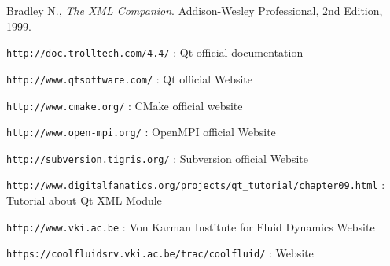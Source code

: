 \begin{thebibliography}{9}
 
  Bradley N.,
  \emph{The XML Companion}.
  Addison-Wesley Professional,
  2nd Edition,
  1999.
 
 \texttt{http://doc.trolltech.com/4.4/} :
 Qt official documentation

 \texttt{http://www.qtsoftware.com/} :
 Qt official Website

 \texttt{http://www.cmake.org/} :
 CMake official website

 \texttt{http://www.open-mpi.org/} :
 OpenMPI official Website

 \texttt{http://subversion.tigris.org/} :
 Subversion official Website

 \texttt{http://www.digitalfanatics.org/projects/qt_tutorial/chapter09.html} :
 Tutorial about Qt XML Module

 \texttt{http://www.vki.ac.be} :
 Von Karman Institute for Fluid Dynamics Website

 \texttt{https://coolfluidsrv.vki.ac.be/trac/coolfluid/} :
 \cf Website

\end{thebibliography}

